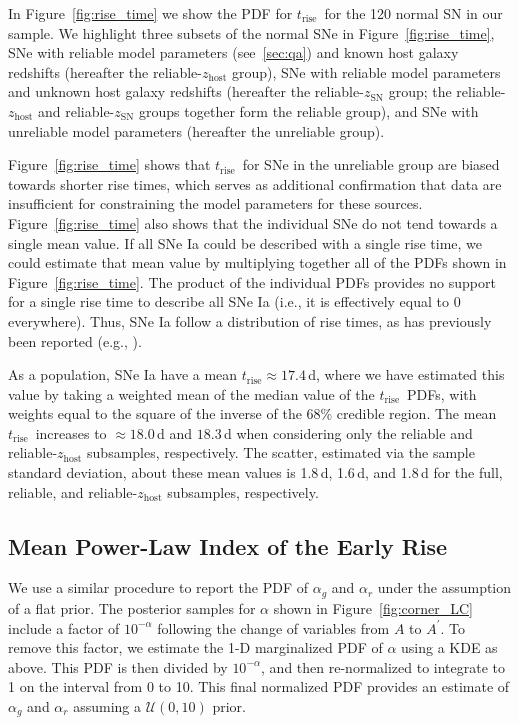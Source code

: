 \documentclass[twocolumn]{./aastex63}
\newcommand{\trise}{$t_\mathrm{rise}$}
\begin{document}
In Figure~\ref{fig:rise_time} we show the PDF for \trise\ for the 120 normal SN
in our sample. We highlight three subsets of the normal SNe in
Figure~\ref{fig:rise_time}, SNe with reliable model parameters
(see~\ref{sec:qa}) and known host galaxy redshifts (hereafter the
reliable-$z_\mathrm{host}$ group), SNe with reliable model parameters and
unknown host galaxy redshifts (hereafter the reliable-$z_\mathrm{SN}$ group; the
reliable-$z_\mathrm{host}$ and reliable-$z_\mathrm{SN}$ groups together form the
reliable group), and SNe with unreliable model parameters (hereafter the
unreliable group).

Figure~\ref{fig:rise_time} shows that \trise\ for SNe in the unreliable group
are biased towards shorter rise times, which serves as additional
confirmation that data are insufficient for constraining the model parameters
for these sources. Figure~\ref{fig:rise_time} also shows that the individual
SNe do not tend towards a single mean value. If all SNe Ia could be described
with a single rise time, we could estimate that mean value by multiplying
together all of the PDFs shown in Figure~\ref{fig:rise_time}. The product of
the individual PDFs provides no support for a single rise time to describe
all SNe Ia (i.e., it is effectively equal to 0 everywhere). Thus, SNe Ia
follow a distribution of rise times, as has previously been reported (e.g.,
\citealt{Riess99a,Ganeshalingam11,Firth15,Zheng17a}).

As a population, SNe Ia have a mean \trise$ \approx 17.4$\,d, where we have
estimated this value by taking a weighted mean of the median value of the
\trise\ PDFs, with weights equal to the square of the inverse of the 68\%
credible region. The mean \trise\ increases to $\approx 18.0$\,d and
$18.3$\,d when considering only the reliable and reliable-$z_\mathrm{host}$
subsamples, respectively. The scatter, estimated via the sample standard
deviation, about these mean values is 1.8\,d, 1.6\,d, and 1.8\,d for the
full, reliable, and reliable-$z_\mathrm{host}$ subsamples, respectively.

\subsection{Mean Power-Law Index of the Early Rise}

We use a similar procedure to report the PDF of $\alpha_g$ and $\alpha_r$ under
the assumption of a flat prior. The posterior samples for $\alpha$ shown in
Figure~\ref{fig:corner_LC} include a factor of $10^{-\alpha}$ following the
change of variables from $A$ to $A^\prime$. To remove this factor, we estimate
the 1-D marginalized PDF of $\alpha$ using a KDE as above. This PDF is then
divided by $10^{-\alpha}$, and then re-normalized to integrate to 1 on the
interval from 0 to 10. This final normalized PDF provides an estimate of
$\alpha_g$ and $\alpha_r$ assuming a $\mathcal{U}(0,10)$ prior.
\end{document}
